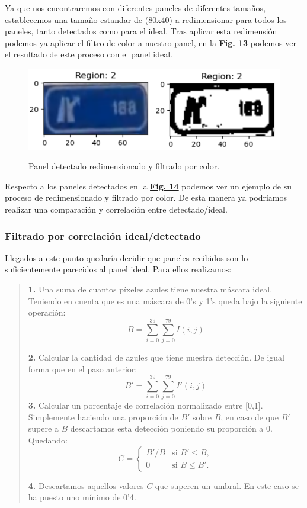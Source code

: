 \documentclass[a4paper, 12pt]{article}
\begin{document}
Ya que nos encontraremos con diferentes paneles de diferentes tamaños, establecemos una tamaño estandar de (80x40) a redimensionar para todos los paneles, tanto detectados como para el ideal. Tras aplicar esta redimensión podemos ya aplicar el filtro de color a nuestro panel, en la \textbf{\hyperref[fig:idealmaskresizedandfiltered]{Fig. 13}} podemos ver el resultado de este proceso con el panel ideal.
\begin{figure}[h]
	\centering
	\caption{Panel detectado redimensionado y filtrado por color.}\vspace{0.5cm}
	\includegraphics[width=0.7\linewidth]{img/sections}
	\label{fig:sections}
\end{figure}

Respecto a los paneles detectados en la \textbf{\hyperref[fig:sections]{Fig. 14}} podemos ver un ejemplo de su proceso de redimensionado y filtrado por color. De esta manera ya podriamos realizar una comparación y correlación entre detectado/ideal.

\subsubsection{Filtrado por correlación ideal/detectado}
Llegados a este punto quedaría decidir que paneles recibidos son lo suficientemente parecidos al panel ideal. Para ellos realizamos:
\begin{quote}
	\textbf{1.} Una suma de cuantos píxeles azules tiene nuestra máscara ideal. Teniendo en cuenta que es una máscara de 0's y 1's queda bajo la siguiente operación:
	\begin{equation}
		B = \sum_{i = 0}^{39}\sum_{j = 0}^{79} I(i, j)
	\end{equation}
	
	\textbf{2.} Calcular la cantidad de azules que tiene nuestra detección. De igual forma que en el paso anterior:
	\begin{equation}
		B' = \sum_{i = 0}^{39}\sum_{j = 0}^{79} I'(i, j)
	\end{equation}
	\textbf{3.} Calcular un porcentaje de correlación normalizado entre [0,1]. Simplemente haciendo una proporción de $B'$ sobre $B$, en caso de que $B'$ supere a $B$ descartamos esta detección poniendo su proporción a 0. Quedando:
	\begin{equation}
		C = 
		\begin{cases} 
			B'/B & \text{si } B' \leq B, \\
			0 & \text{si } B \leq B'.
		\end{cases}
	\end{equation}
	
	\textbf{4.} Descartamos aquellos valores $C$ que superen un umbral. En este caso se ha puesto uno mínimo de 0'4.
\end{quote}
\end{document}

